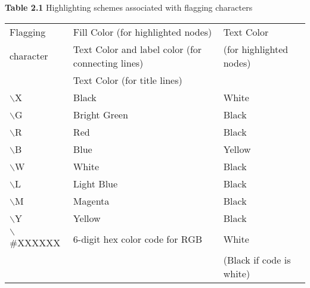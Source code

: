 \documentclass[12pt]{article}
\begin{document}
\begin{flushleft}
\textbf{{\footnotesize{}Table 2.1 }}{\footnotesize{} Highlighting schemes associated with flagging characters}
\end{flushleft}

\begin{flushleft}

\end{flushleft}

\begin{tabular}{|l|l|l|} \hline
Flagging  & Fill Color (for highlighted nodes)  & Text Color  \\
character  & Text Color and label color (for connecting lines) & (for highlighted nodes) \\
 & Text Color (for title lines) & \\ \hline

\ensuremath{\backslash}X  &                      Black    &               White \\ \hline

\ensuremath{\backslash}G   &                     Bright Green        &    Black \\ \hline

\ensuremath{\backslash}R   &                     Red                 &                    Black \\ \hline

\ensuremath{\backslash}B   &                     Blue                &                    Yellow \\ \hline

\ensuremath{\backslash}W   &                     White               &                    Black \\ \hline

\ensuremath{\backslash}L   &                     Light Blue          &    Black \\ \hline

\ensuremath{\backslash}M   &                     Magenta             &    Black \\ \hline

\ensuremath{\backslash}Y   &                     Yellow              &            Black \\ \hline

\ensuremath{\backslash}\#XXXXXX & 6-digit hex color code for RGB &  White \\ 
 & & (Black if code is white) \\ \hline
\end{tabular}
\end{document}
